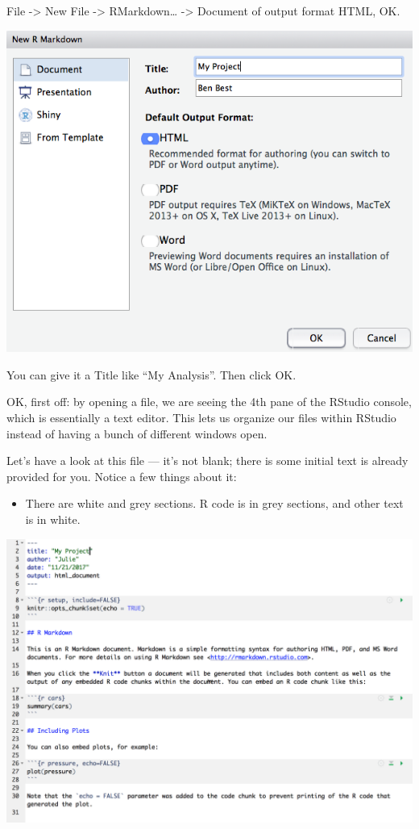 \documentclass[]{book}
\providecommand{\tightlist}{%
  \setlength{\itemsep}{0pt}\setlength{\parskip}{0pt}}
\begin{document}
File -\textgreater{} New File -\textgreater{} RMarkdown\ldots{} -\textgreater{} Document of output format HTML, OK.

\includegraphics[width=0.8\linewidth]{img/rstudio_new-rmd-doc-html}

You can give it a Title like ``My Analysis''. Then click OK.

OK, first off: by opening a file, we are seeing the 4th pane of the RStudio console, which is essentially a text editor. This lets us organize our files within RStudio instead of having a bunch of different windows open.

Let's have a look at this file --- it's not blank; there is some initial text is already provided for you. Notice a few things about it:

\begin{itemize}
\tightlist
\item
  There are white and grey sections. R code is in grey sections, and other text is in white.
\end{itemize}

\includegraphics[width=0.8\linewidth]{img/rmarkdown}
\end{document}
